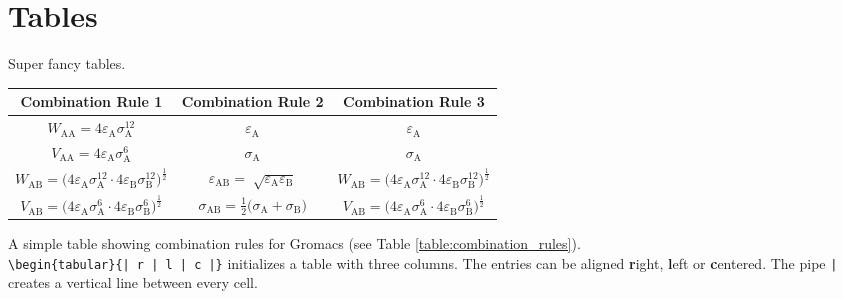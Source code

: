 \chapter{Tables}
Super fancy tables.

\begin{center}
\label{table:combination_rules} %
\begin{tabular}{| c | c | c |}
\textbf{Combination Rule 1} & \textbf{Combination Rule 2} & \textbf{Combination Rule 3} \\
\hline
$W_\mathrm{AA} = 4\varepsilon_\mathrm{A}\sigma^{12}_\mathrm{A}$ & $\varepsilon_\mathrm{A}$ & $\varepsilon_\mathrm{A}$ \\
$V_\mathrm{AA} = 4\varepsilon_\mathrm{A}\sigma^{6}_\mathrm{A}$ & $\sigma_\mathrm{A}$ & $\sigma_\mathrm{A}$ \\
\hline
$W_\mathrm{AB} = \Big( 4\varepsilon_\mathrm{A}\sigma^{12}_\mathrm{A} \cdot 4\varepsilon_\mathrm{B}\sigma^{12}_\mathrm{B} \Big)^{\frac{1}{2}}$ & $\varepsilon_\mathrm{AB} = \sqrt[]{\varepsilon_\mathrm{A}\varepsilon_\mathrm{B}}$ & $W_\mathrm{AB} = \Big( 4\varepsilon_\mathrm{A}\sigma^{12}_\mathrm{A} \cdot 4\varepsilon_\mathrm{B}\sigma^{12}_\mathrm{B} \Big)^{\frac{1}{2}}$ \\
$V_\mathrm{AB} = \Big( 4\varepsilon_\mathrm{A}\sigma^{6}_\mathrm{A} \cdot 4\varepsilon_\mathrm{B}\sigma^{6}_\mathrm{B} \Big)^{\frac{1}{2}}$ & $\sigma_\mathrm{AB} = \frac{1}{2}\big(\sigma_\mathrm{A} + \sigma_\mathrm{B} \big)$ & $V_\mathrm{AB} = \Big( 4\varepsilon_\mathrm{A}\sigma^{6}_\mathrm{A} \cdot 4\varepsilon_\mathrm{B}\sigma^{6}_\mathrm{B} \Big)^{\frac{1}{2}}$ \\
\end{tabular}
\end{center}
\noindent
A simple table showing combination rules for Gromacs (see Table \ref{table:combination_rules}).\\
\verb+\begin{tabular}{| r | l | c |}+ initializes a table with three columns. The entries can be aligned \textbf{r}ight, \textbf{l}eft or \textbf{c}entered. The pipe \verb+|+ creates a vertical line between every cell.\\
\newline

